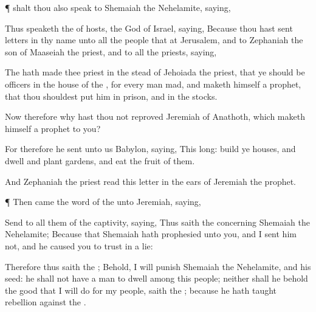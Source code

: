 {\par }{\PP {}¶
{} shalt thou also
speak to
Shemaiah the
Nehelamite,
saying,

Thus
speaketh the
{} of
hosts, the
God of
Israel,
saying, Because thou hast
sent
letters in thy
name unto all the
people that
{} at
Jerusalem, and to
Zephaniah the
son of
Maaseiah the
priest, and to all the
priests,
saying,

The
{} hath
made thee
priest in the stead of
Jehoiada the
priest, that ye should be
officers in the
house of the
{}, for every
man
{}
mad, and maketh himself a
prophet, that thou shouldest
put him in
prison, and in the
stocks.

Now therefore why hast thou not
reproved
Jeremiah of
Anathoth, which maketh himself a
prophet to you?

For therefore he
sent unto us
{}
Babylon,
saying,
This
{}
long:
build ye
houses, and
dwell
{} and
plant
gardens, and
eat the
fruit of them.

And
Zephaniah the
priest
read this
letter in the
ears of
Jeremiah the
prophet.


\par }{\PP {}¶ Then came the
word of the
{} unto
Jeremiah,
saying,

Send to all them of the
captivity,
saying, Thus
saith the
{} concerning
Shemaiah the
Nehelamite; Because that
Shemaiah hath
prophesied unto you, and I
sent him not, and he caused you to
trust in a
lie:

Therefore thus
saith the
{}; Behold, I will
punish
Shemaiah the
Nehelamite, and his
seed: he shall not have a
man to
dwell
among this
people; neither shall he
behold the
good that I will
do for my
people,
saith the
{}; because he hath
taught
rebellion against the
{}.




\par }
